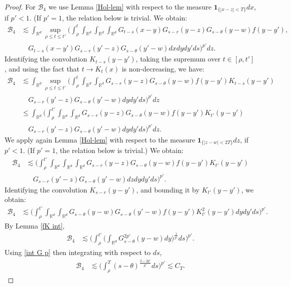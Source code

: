 \documentclass[10pt,a4paper]{amsart}
\def\bR{\mathbb{R}}
\def\cB{\mathcal{B}}
\newcommand{\les}{\lesssim}
\begin{document}
\begin{proof}
For $\cB_4$ we use Lemma \ref{Hol-lem} with respect to the measure $\mathbf 1_{\{|x-z| < T\}}dx$, if $p'< 1$. (If $p'  = 1$, the relation below is trivial. We obtain: 
\begin{align*}
 \cB_4 & \les \int_{\bR^d} \sup_{\rho \leq t \leq t'}  \bigg(\int_\rho^t \int_{\bR^d} \int_{\bR^d} \int_{\bR^d} G_{t-s}(x-y)G_{s-r}(y-z)G_{s-\theta}(y-w) f(y-y'), \\
 & \quad G_{t-s}(x-y') G_{s-r}(y'-z)G_{s-\theta}(y'-w) dx dy dy' ds \bigg)^{p'} dz.
 \end{align*}
Identifying the convolution $K_{t-s}(y-y')$, taking the supremum over $t \in [\rho,t']$, and using the fact that $t \to K_t(x)$ is non-decreasing, we have:
\begin{align*}
 \cB_4 & \les \int_{\bR^d} \sup_{\rho \leq t \leq t'}  \bigg(\int_\rho^t \int_{\bR^d} \int_{\bR^d} G_{s-r}(y-z)G_{s-\theta}(y-w) f(y-y') K_{t-s}(y-y') \\
 & \quad G_{s-r}(y'-z)G_{s-\theta}(y'-w)  dy dy' ds \bigg)^{p'} dz \\
 & \leq \int_{\bR^d} \bigg(\int_\rho^{t'} \int_{\bR^d} \int_{\bR^d} G_{s-r}(y-z)G_{s-\theta}(y-w) f(y-y') K_{t'}(y-y') \\
 & \quad G_{s-r}(y'-z)G_{s-\theta}(y'-w)  dy dy' ds \bigg)^{p'} dz.
\end{align*}
We apply again Lemma \ref{Hol-lem} with respect to the measure $\mathbf 1_{\{|z-w| < 2T\}}dz$, if $p' < 1$. (If $p'=1$, the relation below is trivial.) We obtain:
\begin{align*}
 \cB_4 & \les \bigg(\int_\rho^{t'} \int_{\bR^d} \int_{\bR^d} \int_{\bR^d} G_{s-r}(y-z)G_{s-\theta}(y-w) f(y-y')  K_{t'}(y-y') \\
 & \quad G_{s-r}(y'-z)G_{s-\theta}(y'-w) dz dy dy' ds \bigg)^{p'}.
\end{align*}
Identifying the convolution $K_{s-r}(y-y')$, and bounding it by $K_{t'}(y-y')$, we obtain:
\begin{align*}
 \cB_4 & \les \bigg(\int_\rho^{t'} \int_{\bR^d} \int_{\bR^d} G_{s-\theta}(y-w) G_{s-\theta}(y'-w) f(y-y') K_{t'}^2(y-y')  dy dy' ds \bigg)^{p'}.
\end{align*}
By Lemma \ref{fK int},%
\begin{align*}
 \cB_4 & \les \bigg(\int_\rho^{t'} \bigg( \int_{\bR^d} G^{2p'}_{s-\theta}(y-w) dy \bigg)^{\frac{1}{p'}} ds\bigg)^{p'}.
\end{align*}
Using \eqref{int G p} then integrating with respect to $ds$,
\begin{align*}
 \cB_4 & \les \bigg(\int_\rho^{T} (s-\theta)^{\frac{2-2p'}{p'}} ds\bigg)^{p'} \les C_{T}.
\end{align*}


\end{proof}
\end{document}
